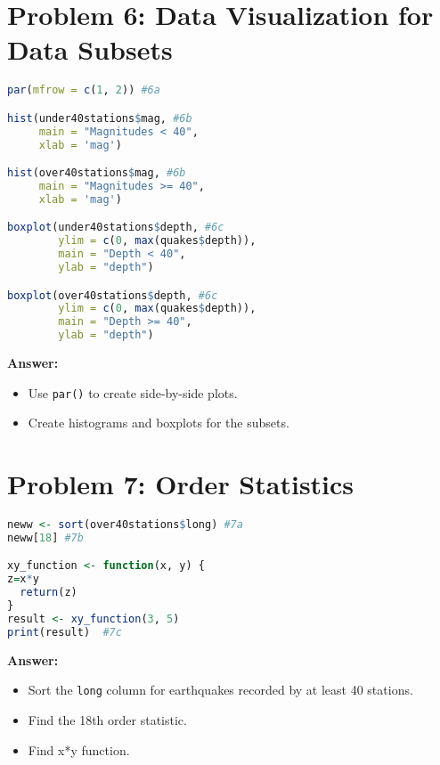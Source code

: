 \documentclass[12pt]{article}
\begin{document}
\section*{Problem 6:  Data Visualization for Data Subsets}
\begin{lstlisting}[language=R]
par(mfrow = c(1, 2)) #6a

hist(under40stations$mag, #6b
     main = "Magnitudes < 40", 
     xlab = 'mag')

hist(over40stations$mag, #6b
     main = "Magnitudes >= 40", 
     xlab = 'mag')

boxplot(under40stations$depth, #6c
        ylim = c(0, max(quakes$depth)),
        main = "Depth < 40", 
        ylab = "depth")

boxplot(over40stations$depth, #6c
        ylim = c(0, max(quakes$depth)),
        main = "Depth >= 40", 
        ylab = "depth")
\end{lstlisting}
\textbf{Answer:}
\begin{itemize}
    \item Use \texttt{par()} to create side-by-side plots.
    \item Create histograms and boxplots for the subsets.
\end{itemize}

\section*{Problem 7: Order Statistics}
\begin{lstlisting}[language=R]
neww <- sort(over40stations$long) #7a
neww[18] #7b

xy_function <- function(x, y) {
z=x*y
  return(z)
}
result <- xy_function(3, 5)
print(result)  #7c
\end{lstlisting}

\textbf{Answer:}
\begin{itemize}
    \item Sort the \texttt{long} column for earthquakes recorded by at least 40 stations.
    \item Find the 18th order statistic.
    \item Find x*y function.
\end{itemize}
\end{document}
